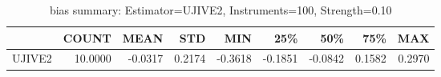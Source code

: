 \begin{table}[ht]
\centering
\caption{bias summary: Estimator=UJIVE2, Instruments=100, Strength=0.10}
\begin{tabular}{lrrrrrrrr}
\toprule
 & COUNT & MEAN & STD & MIN & 25\% & 50\% & 75\% & MAX \\
\midrule
UJIVE2 & 10.0000 & -0.0317 & 0.2174 & -0.3618 & -0.1851 & -0.0842 & 0.1582 & 0.2970 \\
\bottomrule
\end{tabular}
\end{table}
